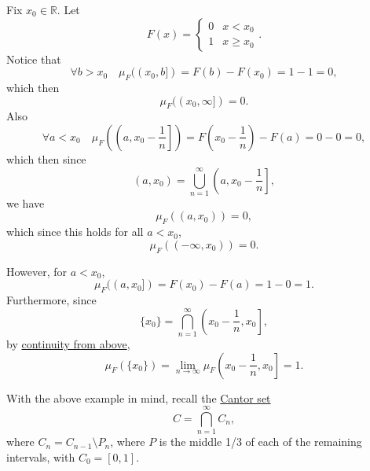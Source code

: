 \documentclass[notoc,notitlepage]{tufte-book}
\begin{document}
\begin{eg}\label{eg:dirac_delta_measure_of_a_point}
  Fix $x_0 \in \mathbb{R}$. Let
  \begin{equation*}
    F(x) = \begin{cases}
      0 & x < x_0 \\
      1 & x \geq x_0
    \end{cases}.
  \end{equation*}
  Notice that
  \begin{equation*}
    \forall b > x_0 \quad
    \mu_F((x_0, b]) = F(b) - F(x_0) = 1 - 1 = 0,
  \end{equation*}
  which then
  \begin{equation*}
    \mu_F((x_0, \infty]) = 0.
  \end{equation*}
  Also
  \begin{equation*}
    \forall a < x_0 \quad
    \mu_F \left( \left( a, x_0 - \frac{1}{n} \right] \right)
    = F \left(x_0 - \frac{1}{n} \right) - F(a) = 0 - 0 = 0,
  \end{equation*}
  which then since
  \begin{equation*}
    (a, x_0) = \bigcup_{n=1}^{\infty} \left( a, x_0 - \frac{1}{n} \right],
  \end{equation*}
  we have
  \begin{equation*}
    \mu_F((a, x_0)) = 0,
  \end{equation*}
  which since this holds for all $a < x_0$,
  \begin{equation*}
    \mu_F((-\infty, x_0)) = 0.
  \end{equation*}

  However, for $a < x_0$,
  \begin{equation*}
    \mu_F((a, x_0]) = F(x_0) - F(a) = 1 - 0 = 1.
  \end{equation*}
  Furthermore, since
  \begin{equation*}
    \{ x_0 \} = \bigcap_{n=1}^{\infty} \left( x_0 - \frac{1}{n}, x_0 \right],
  \end{equation*}
  by \hyperref[thm:properties_of_a_measure]{continuity from above},
  \begin{equation*}
    \mu_F(\{ x_0 \})
    = \lim_{n \to \infty} \mu_F \left( x_0 - \frac{1}{n}, x_0 \right] = 1.
  \end{equation*}
\end{eg}

With the above example in mind, recall the
\href{https://tex.japorized.ink/PMATH450/classnotes.pdf\#chapter.5}{Cantor set}
\begin{equation*}
  C = \bigcap_{n=1}^{\infty} C_n,
\end{equation*}
where $C_n = C_{n-1} \setminus P_n$,
where $P$ is the middle 1/3 of each of the remaining intervals,
with $C_0 = [0, 1]$.
\end{document}
